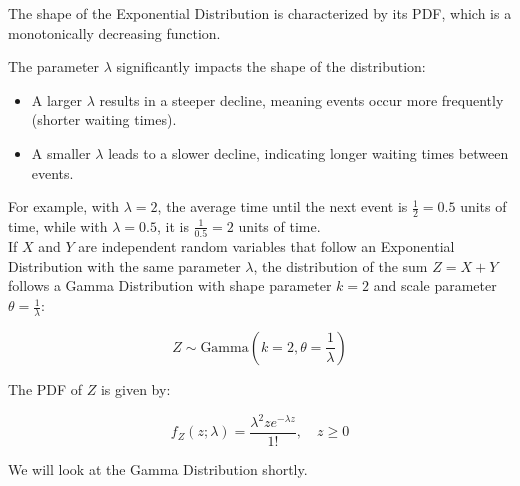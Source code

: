 The shape of the Exponential Distribution is characterized by its PDF, which is a monotonically decreasing function. 
\begin{center}
    
\end{center}

The parameter $\lambda$ significantly impacts the shape of the distribution:
\begin{itemize}
    \item A larger $\lambda$ results in a steeper decline, meaning events occur more frequently (shorter waiting times).
    \item A smaller $\lambda$ leads to a slower decline, indicating longer waiting times between events.
\end{itemize}

For example, with $\lambda = 2$, the average time until the next event is $\frac{1}{2} = 0.5$ units of time, while with $\lambda = 0.5$, it is $\frac{1}{0.5} = 2$ units of time.\\

If $X$ and $Y$ are independent random variables that follow an Exponential Distribution with the same parameter $\lambda$, the distribution of the sum $Z = X + Y$ follows a Gamma Distribution with shape parameter $k = 2$ and scale parameter $\theta = \frac{1}{\lambda}$:

\[
Z \sim \text{Gamma}(k=2, \theta=\frac{1}{\lambda})
\]

The PDF of $Z$ is given by:

\[
f_Z(z; \lambda) = \frac{\lambda^2 z e^{-\lambda z}}{1!}, \quad z \geq 0
\]

We will look at the Gamma Distribution shortly. 

